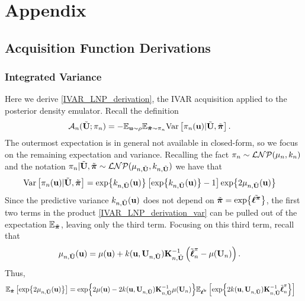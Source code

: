 \documentclass[12pt]{article}
\begin{document}
\section{Appendix}
\subsection{Acquisition Function Derivations}
\subsubsection{Integrated Variance}
Here we derive \ref{IVAR_LNP_derivation}, the IVAR acquisition applied to the posterior density emulator. Recall the definition 
\begin{align}
\acq[\designIdx](\batchMat; \unPostPred) &= -\E_{\bpar \sim \rho} \E_{\tilde{\boldsymbol{\postDens}}  \sim \unPostPred} \Var\left[\unPostPred(\bpar) | \batchMat, \tilde{\boldsymbol{\postDens}} \right].
\end{align}
The outermost expectation is in general not available in closed-form, so we focus on the remaining expectation and variance. Recalling the fact 
$\unPostPred \sim \LNP(\logUnPostMeanPred, \logUnPostKerPred)$ and the notation 
$\unPostPred | \batchMat, \tilde{\boldsymbol{\postDens}} \sim \LNP(\logUnPostMeanPred[\designIdx, \batchMat], \logUnPostKerPred[\designIdx, \batchMat])$
we have that 
\begin{align}
\Var\left[\unPostPred(\bpar) | \batchMat, \tilde{\boldsymbol{\postDens}} \right] &= \Exp{\logUnPostKerPred[\designIdx, \batchMat](\bpar)} \left[\Exp{\logUnPostKerPred[\designIdx, \batchMat](\bpar)} - 1\right] \Exp{2 \logUnPostMeanPred[\designIdx, \batchMat](\bpar)} \label{IVAR_LNP_derivation_var} 
\end{align}
Since the predictive variance $\logUnPostKerPred[\designIdx, \batchMat](\bpar)$ does not depend on 
$\tilde{\boldsymbol{\postDens}} = \Exp{\tilde{\boldsymbol{\logUnPost}}}$, the first two terms in the 
product \ref{IVAR_LNP_derivation_var} can be pulled out of the expectation $\E_{\tilde{\boldsymbol{\postDens}}}$, leaving only the third term. Focusing on this third term, 
recall that 
\begin{align*}
\logUnPostMeanPred[\designIdx, \batchMat](\bpar) &= \logUnPostMean(\bpar) + \logUnPostKer(\bpar, \designMat[\designIdx, \batchMat]) \KerMat[\designIdx, \batchMat]^{-1} \left(\logUnPostObsBatch - \logUnPostMean(\designMat) \right).
\end{align*}
Thus, 
\begin{align}
\E_{\tilde{\boldsymbol{\postDens}}}\left[\Exp{2 \logUnPostMeanPred[\designIdx, \batchMat](\bpar)} \right] 
&= \Exp{2\logUnPostMean(\bpar) - 2\logUnPostKer(\bpar, \designMat[\designIdx, \batchMat]) \KerMat[\designIdx, \batchMat]^{-1} \logUnPostMean(\designMat)}
\E_{\tilde{\boldsymbol{\logUnPost}}}\left[\Exp{2\logUnPostKer(\bpar, \designMat[\designIdx, \batchMat]) \KerMat[\designIdx, \batchMat]^{-1}\logUnPostObsBatch } \right] 
\label{IVAR_LNP_derivation_exp_mean_term} 
\end{align}
\end{document}
